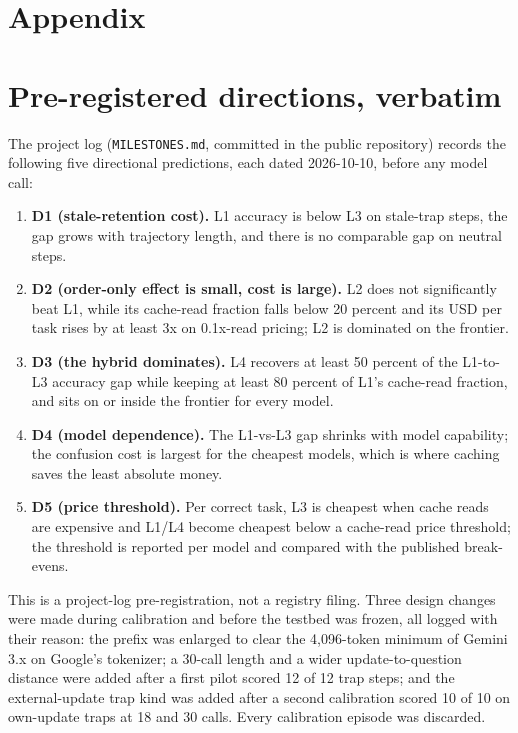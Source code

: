 \appendix
\section*{Appendix}
\section{Pre-registered directions, verbatim}
\label{app:prereg}
The project log (\texttt{MILESTONES.md}, committed in the public repository) records the following five directional predictions, each dated 2026-10-10, before any model call:
\begin{enumerate}
\item \textbf{D1 (stale-retention cost).} L1 accuracy is below L3 on stale-trap steps, the gap grows with trajectory length, and there is no comparable gap on neutral steps.
\item \textbf{D2 (order-only effect is small, cost is large).} L2 does not significantly beat L1, while its cache-read fraction falls below 20 percent and its USD per task rises by at least 3x on 0.1x-read pricing; L2 is dominated on the frontier.
\item \textbf{D3 (the hybrid dominates).} L4 recovers at least 50 percent of the L1-to-L3 accuracy gap while keeping at least 80 percent of L1's cache-read fraction, and sits on or inside the frontier for every model.
\item \textbf{D4 (model dependence).} The L1-vs-L3 gap shrinks with model capability; the confusion cost is largest for the cheapest models, which is where caching saves the least absolute money.
\item \textbf{D5 (price threshold).} Per correct task, L3 is cheapest when cache reads are expensive and L1/L4 become cheapest below a cache-read price threshold; the threshold is reported per model and compared with the published break-evens.
\end{enumerate}
This is a project-log pre-registration, not a registry filing. Three design changes were made during calibration and before the testbed was frozen, all logged with their reason: the prefix was enlarged to clear the 4,096-token minimum of Gemini 3.x on Google's tokenizer; a 30-call length and a wider update-to-question distance were added after a first pilot scored 12 of 12 trap steps; and the external-update trap kind was added after a second calibration scored 10 of 10 on own-update traps at 18 and 30 calls. Every calibration episode was discarded.

